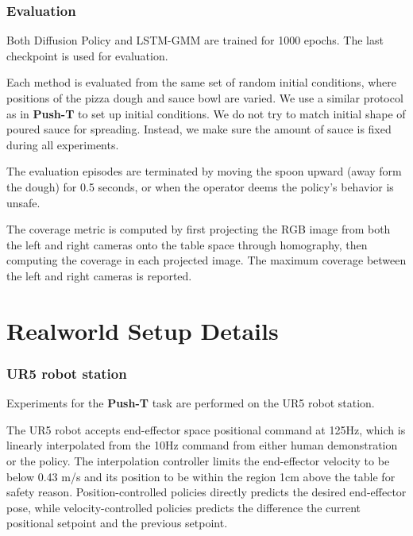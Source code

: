 \subsubsection{Evaluation}
Both Diffusion Policy and LSTM-GMM are trained for 1000 epochs. The last checkpoint is used for evaluation.

Each method is evaluated from the same set of random initial conditions, where positions of the pizza dough and sauce bowl are varied. We use a similar protocol as in \textbf{Push-T} to set up initial conditions. We do not try to match initial shape of poured sauce for spreading. Instead, we make sure the amount of sauce is fixed during all experiments. 

The evaluation episodes are terminated by moving the spoon upward (away form the dough) for 0.5 seconds, or when the operator deems the policy's behavior is unsafe.

The coverage metric is computed by first projecting the RGB image from both the left and right cameras onto the table space through homography, then computing the coverage in each projected image. The maximum coverage between the left and right cameras is reported.















\section{Realworld Setup Details}

\subsubsection{UR5 robot station}
\label{sec:ur5_setup}
Experiments for the \textbf{Push-T} task are performed on the UR5 robot station. 

The UR5 robot accepts end-effector space positional command at 125Hz, which is linearly interpolated from the 10Hz command from either human demonstration or the policy. The interpolation controller limits the end-effector velocity to be below 0.43 m/s and its position to be within the region 1cm above the table for safety reason. Position-controlled policies directly predicts the desired end-effector pose, while velocity-controlled policies predicts the difference the current positional setpoint and the previous setpoint. 

